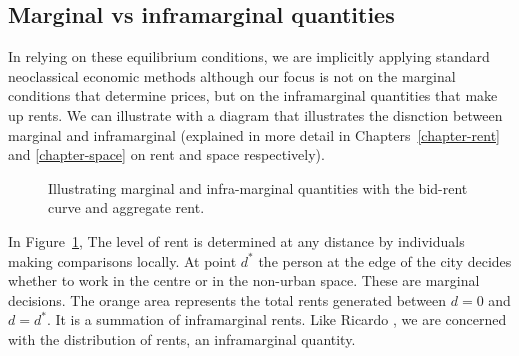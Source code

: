 




\subsection{Marginal vs inframarginal quantities}
In relying on these equilibrium conditions, we are implicitly applying standard neoclassical economic methods although our focus is not on the \gls{marginal} conditions that determine prices, but on the \gls{inframarginal} quantities that make up rents. We can illustrate with a diagram that illustrates the disnction between marginal and inframarginal (explained in more detail in Chapters~\ref{chapter-rent} and \ref{chapter-space} on rent and space respectively). 

\vspace{.3cm}
\begin{figure}[h!t!]
\centering

\caption{Illustrating marginal and infra-marginal quantities with the bid-rent curve and aggregate rent.}
\label{fig-land-rent-as-inframarginal}
\end{figure}

In Figure~\ref{fig-land-rent-as-inframarginal}, The level of rent is determined at any distance by individuals making comparisons locally. At point $d^*$ the person at the edge of the city decides whether to work in the centre or in the non-urban space. These are \gls{marginal} decisions. The orange area represents the total rents generated between $d=0$ and $d=d^*$. It is a summation of \gls{inframarginal} rents. Like Ricardo \cite{ricardoEssayInfluenceLow1815}, we are concerned with the distribution of rents, an inframarginal quantity.



